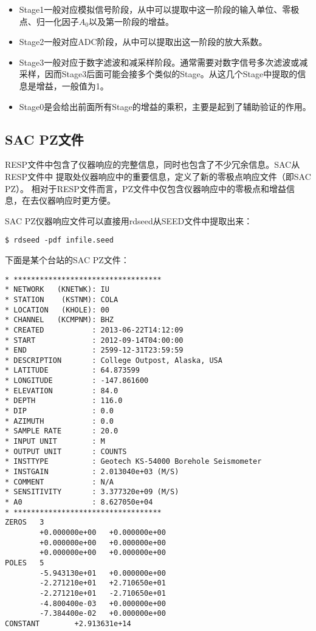 \begin{itemize}
\item Stage1一般对应模拟信号阶段，从中可以提取中这一阶段的输入单位、零极点、归一化因子$A_0$以及第一阶段的增益。
\item Stage2一般对应ADC阶段，从中可以提取出这一阶段的放大系数。
\item Stage3一般对应于数字滤波和减采样阶段。通常需要对数字信号多次滤波或减采样，因而Stage3后面可能会接多个类似的Stage。从这几个Stage中提取的信息是增益，一般值为1。
\item Stage0是会给出前面所有Stage的增益的乘积，主要是起到了辅助验证的作用。
\end{itemize}

\subsection{SAC PZ文件}
RESP文件中包含了仪器响应的完整信息，同时也包含了不少冗余信息。SAC从RESP文件中
提取处仪器响应中的重要信息，定义了新的零极点响应文件（即SAC PZ）。
相对于RESP文件而言，PZ文件中仅包含仪器响应中的零极点和增益信息，在去仪器响应时更方便。

SAC PZ仪器响应文件可以直接用rdseed从SEED文件中提取出来：
\begin{verbatim}
$ rdseed -pdf infile.seed
\end{verbatim}

下面是某个台站的SAC PZ文件：
\begin{verbatim}
* **********************************
* NETWORK   (KNETWK): IU
* STATION    (KSTNM): COLA
* LOCATION   (KHOLE): 00
* CHANNEL   (KCMPNM): BHZ
* CREATED           : 2013-06-22T14:12:09
* START             : 2012-09-14T04:00:00
* END               : 2599-12-31T23:59:59
* DESCRIPTION       : College Outpost, Alaska, USA
* LATITUDE          : 64.873599
* LONGITUDE         : -147.861600
* ELEVATION         : 84.0
* DEPTH             : 116.0
* DIP               : 0.0
* AZIMUTH           : 0.0
* SAMPLE RATE       : 20.0
* INPUT UNIT        : M
* OUTPUT UNIT       : COUNTS
* INSTTYPE          : Geotech KS-54000 Borehole Seismometer
* INSTGAIN          : 2.013040e+03 (M/S)
* COMMENT           : N/A
* SENSITIVITY       : 3.377320e+09 (M/S)
* A0                : 8.627050e+04
* **********************************
ZEROS   3
        +0.000000e+00   +0.000000e+00
        +0.000000e+00   +0.000000e+00
        +0.000000e+00   +0.000000e+00
POLES   5
        -5.943130e+01   +0.000000e+00
        -2.271210e+01   +2.710650e+01
        -2.271210e+01   -2.710650e+01
        -4.800400e-03   +0.000000e+00
        -7.384400e-02   +0.000000e+00
CONSTANT        +2.913631e+14
\end{verbatim}

